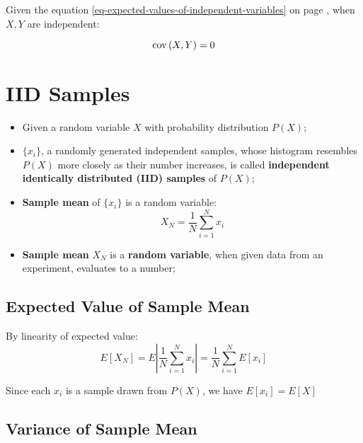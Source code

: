     Given the equation \ref{eq-expected-values-of-independent-variables} on page \pageref{eq-expected-values-of-independent-variables}, when $ X, Y $ are independent:
    
    \begin{equation}
      \operatorname{cov} \left( X, Y \right) = 0
    \end{equation}
    
\section{IID Samples}
  
  \begin{itemize}
    \item Given a random variable $ X $ with probability distribution $ P (X) $;
    \item $ \{ x_{i} \} $, a randomly generated independent samples, whose histogram resembles $ P(X) $ more closely as their number increases, is called \textbf{independent identically distributed (IID) samples} of $  P(X) $;
    \item \textbf{Sample mean} of $ \{ x_{i} \} $ is a random variable:
    \begin{displaymath}
      X_{N} = \frac{1}{N} \sum_{i = 1}^{N} x_{i}
    \end{displaymath}
    
    \item \textbf{Sample mean} $ X_{N} $ is a \textbf{random variable}, when given data from an experiment, evaluates to a number;
  \end{itemize}
  
  \subsection{Expected Value of Sample Mean}
  
    By linearity of expected value: 
    \begin{equation}
      E \left[ X_{N} \right] = E \left| \frac{1}{N} \sum_{i = 1}^{N} x_{i} \right| = \frac{1}{N} \sum_{i = 1}^{N} E \left[ x_{i} \right]
    \end{equation}
    
    Since each $ x_{i} $ is a sample drawn from $ P \left( X \right) $, we have $ E \left[ x_{i} \right] = E \left[ X \right] $
    
  \subsection{Variance of Sample Mean}
  
